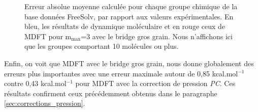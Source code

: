 \begin{figure}[ht]
  \centering
  \caption[Erreur absolue moyenne pour chaque groupe chimique de la base données FreeSolv calculée par MDFT avec le bridge gros grain.]{Erreur absolue moyenne calculée pour chaque groupe chimique de la base données FreeSolv, par rapport aux valeurs expérimentales. En bleu, les résultats de dynamique moléculaire et en rouge ceux de MDFT pour $\mathrm{m}_\mathrm{max}$=3 avec le bridge gros grain. Nous n'affichons ici que les groupes comportant 10 molécules ou plus.}
  \label{fig:AUE:mmax3_cgb}
\end{figure}


Enfin, on voit que MDFT avec le bridge gros grain, nous donne globalement des erreurs plus importantes avec une erreur maximale autour de 0,85 kcal.mol$^{-1}$ contre 0,43 kcal.mol$^{-1}$ pour MDFT avec la correction de pression \textit{PC}. Ces résultats confirment ceux précédemment obtenus dans le paragraphe \ref{sec:corrections_pression}. 
\clearpage






